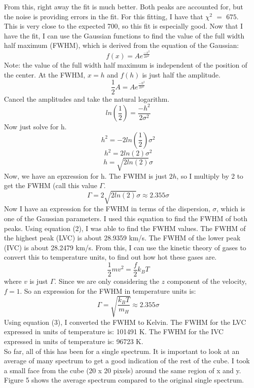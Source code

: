 \documentclass[12pt]{report}
\begin{document}
From this, right away the fit is much better. Both peaks are accounted for, but the noise is providing errors in the fit.
For this fitting, I have that $\chi^{2}$ $=$ $675$.
This is very close to the expected 700, so this fit is especially good.
Now that I have the fit, I can use the Gaussian functions to find the value of the full width half maximum (FWHM), which is derived from the equation of the Gaussian:
$$ f(x) = Ae^{\frac{-x^{2}}{2\sigma^{2}}} $$
Note: the value of the full width half maximum is independent of the position of the center. 
At the FWHM, $x = h$ and $f(h)$ is just half the amplitude.
$$ \frac{1}{2}A = Ae^{\frac{-h^{2}}{2\sigma^{2}}} $$
Cancel the amplitudes and take the natural logarithm.
$$ ln(\frac{1}{2}) = \frac{-h^{2}}{2\sigma^{2}} $$ 
Now just solve for h.
$$ h^{2} = -2ln(\frac{1}{2})\sigma^{2}  $$
$$  h^{2} = 2ln(2)\sigma^{2} $$
$$  h = \sqrt{2ln(2)}\sigma $$
Now, we have an epxression for h. The FWHM is just $2h$, so I multiply by 2 to get the FWHM (call this value $\Gamma$.
\begin{equation}
 \Gamma = 2\sqrt{2ln(2)}\sigma \approx 2.355\sigma
\end{equation}
Now I have an expression for the FWHM in terms of the dispersion, $\sigma$, which is one of the Gaussian parameters.
I used this equation to find the FWHM of both peaks. 
Using equation (2), I was able to find the FWHM values.
The FWHM of the highest peak (LVC) is about 28.9359 km/s.
The FWHM of the lower peak (IVC) is about 28.2479 km/s. From this, I can use the kinetic theory of gases to convert this to temperature units, to find out how hot these gases are.
$$ \frac{1}{2} m v^{2} = \frac{f}{2} k_{B} T $$
where $v$ is just $\Gamma$.
Since we are only considering the $z$ component of the velocity, $f = 1$. 
So an expression for the FWHM in temperature units is:
\begin{equation}
\Gamma = \sqrt{\frac{k_B T}{m_H}} \approx 2.355\sigma
\end{equation}
Using equation (3), I converted the FWHM to Kelvin.
The FWHM for the LVC expressed in units of temperature is: 101491 K.
The FWHM for the IVC expressed in units of temperature is: 96723 K. \\
So far, all of this has been for a single spectrum. 
It is important to look at an average of many spectrum to get a good indication of the rest of the cube. 
I took a small face from the cube (20 x 20 pixels) around the same region of x and y.
Figure 5 shows the average spectrum compared to the original single spectrum.
\end{document}
